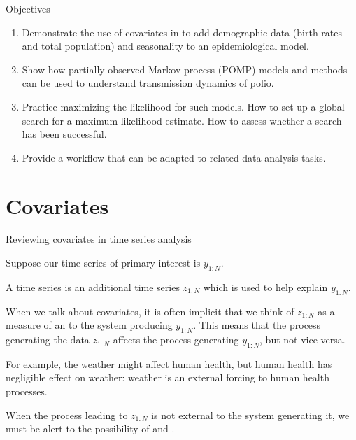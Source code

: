 \begin{frame}{Objectives}



\begin{enumerate}

\item Demonstrate the use of covariates in  to add demographic data (birth rates and total population) and  seasonality to an epidemiological model.

\item Show how partially observed Markov process (POMP) models and methods can be used to understand transmission dynamics of polio.

\item Practice maximizing the likelihood for such models. How to set up a global search for a maximum likelihood estimate. How to assess whether a search has been successful.

\item Provide a workflow that can be adapted to related data analysis tasks.

\end{enumerate}

\end{frame}

\section{Covariates}

\begin{frame}{Reviewing covariates in time series analysis}

\bi

\item Suppose our time series of primary interest is $y_{1:N}$.

\item A  time series is an additional time series ${z_{1:N}}$ which is used to help explain $y_{1:N}$.

\item When we talk about covariates, it is often implicit that we think of ${z_{1:N}}$ as a measure of an  to the system producing $y_{1:N}$. This means that the process generating the data ${z_{1:N}}$ affects the process generating $y_{1:N}$, but not vice versa. 

 \item For example, the weather might affect human health, but human health has negligible effect on weather: weather is an external forcing to human health processes.

\item When the process leading to  ${z_{1:N}}$ is not external to the system generating it, we must be alert to the possibility of  and .

\ei

\end{frame}

